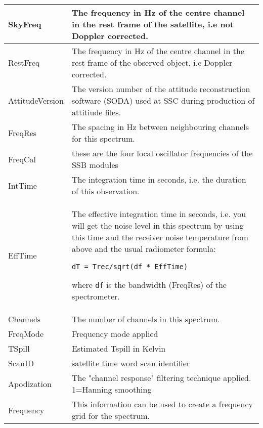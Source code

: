 \begin{longtable}{| p{} | p{} |}
     SkyFreq         & The frequency in Hz of the centre channel in the rest frame of the
                         satellite, i.e not Doppler corrected.\\ \hline
     RestFreq        & The frequency in Hz of the centre channel in the rest frame of the
                         observed object, i.e Doppler corrected.\\ \hline
     AttitudeVersion & The version number of the attitude reconstruction software (SODA) 
                         used at SSC during production of attitiude files.\\  \hline
     FreqRes         & The spacing in Hz between neighbouring channels for this spectrum. \\ \hline
     FreqCal         & these are the four local oscillator frequencies of the SSB modules\\ \hline
     IntTime         & The integration time in seconds, i.e. the duration of this observation.\\ \hline
     EffTime         & The effective integration time in seconds, i.e. you will get the
                         noise level in this spectrum by using this time and the receiver noise 
                         temperature from above and the usual radiometer formula:
                        \begin{verbatim}dT = Trec/sqrt(df * EffTime)\end{verbatim}
                         where {\tt df} is the bandwidth (FreqRes) of the spectrometer.\\ \hline
     Channels        & The number of channels in this spectrum.\\ \hline
     FreqMode        & Frequency mode applied\\ \hline
     TSpill          & Estimated Tspill in Kelvin \\ \hline
     ScanID          & satellite time word scan identifier\\ \hline
     Apodization     & The "channel response" filtering technique applied. 1=Hanning smoothing \\ \hline 
     Frequency       & This information can be used to create a frequency grid for the spectrum.

\end{longtable}
